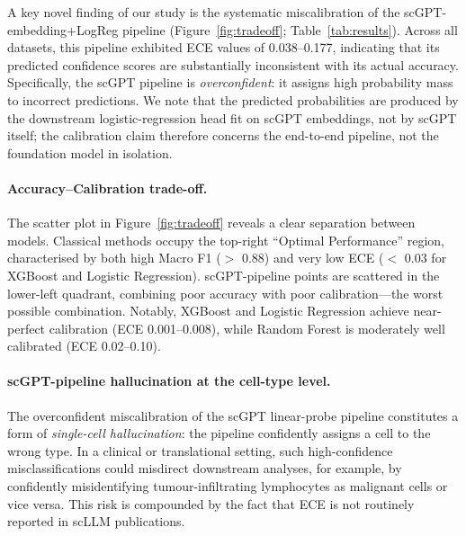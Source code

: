 \documentclass[11pt,a4paper]{article}
\begin{document}
A key novel finding of our study is the systematic miscalibration of the scGPT-embedding+LogReg pipeline (Figure~\ref{fig:tradeoff}; Table~\ref{tab:results}). Across all datasets, this pipeline exhibited ECE values of 0.038--0.177, indicating that its predicted confidence scores are substantially inconsistent with its actual accuracy. Specifically, the scGPT pipeline is \textit{overconfident}: it assigns high probability mass to incorrect predictions. We note that the predicted probabilities are produced by the downstream logistic-regression head fit on scGPT embeddings, not by scGPT itself; the calibration claim therefore concerns the end-to-end pipeline, not the foundation model in isolation.

\paragraph{Accuracy--Calibration trade-off.} The scatter plot in Figure~\ref{fig:tradeoff} reveals a clear separation between models. Classical methods occupy the top-right ``Optimal Performance'' region, characterised by both high Macro F1 ($>$ 0.88) and very low ECE ($<$ 0.03 for XGBoost and Logistic Regression). scGPT-pipeline points are scattered in the lower-left quadrant, combining poor accuracy with poor calibration---the worst possible combination. Notably, XGBoost and Logistic Regression achieve near-perfect calibration (ECE 0.001--0.008), while Random Forest is moderately well calibrated (ECE 0.02--0.10).

\paragraph{scGPT-pipeline hallucination at the cell-type level.} The overconfident miscalibration of the scGPT linear-probe pipeline constitutes a form of \textit{single-cell hallucination}: the pipeline confidently assigns a cell to the wrong type. In a clinical or translational setting, such high-confidence misclassifications could misdirect downstream analyses, for example, by confidently misidentifying tumour-infiltrating lymphocytes as malignant cells or vice versa. This risk is compounded by the fact that ECE is not routinely reported in scLLM publications.
\end{document}

